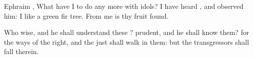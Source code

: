 {\par }{\PP {}Ephraim
{}, What have I to do any more with
idols? I have
heard
{}, and
observed him: I
{} like a
green fir
tree. From me is thy
fruit
found.

Who
{}
wise, and he shall
understand these
{}?
prudent, and he shall
know them? for the
ways of the
{}
{}
right, and the
just shall
walk in them: but the
transgressors shall
fall therein.


\par }
